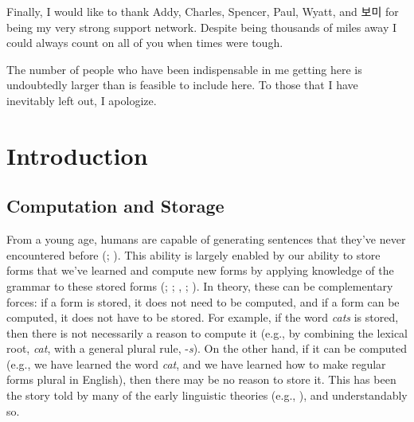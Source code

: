 \documentclass[
  letterpaper,
  DIV=11,
  numbers=noendperiod,
  nottoc]{scrreprt}
\begin{document}
Finally, I would like to thank Addy, Charles, Spencer, Paul, Wyatt, and
보미 for being my very strong support network. Despite being thousands
of miles away I could always count on all of you when times were tough.

The number of people who have been indispensable in me getting here is
undoubtedly larger than is feasible to include here. To those that I
have inevitably left out, I apologize.


\chapter{Introduction}\label{introduction}


\section{Computation and Storage}\label{computation-and-storage}

From a young age, humans are capable of generating sentences that
they've never encountered before
(;
). This ability
is largely enabled by our ability to store forms that we've learned and
compute new forms by applying knowledge of the grammar to these stored
forms (;
;
,
;
). In theory,
these can be complementary forces: if a form is stored, it does not need
to be computed, and if a form can be computed, it does not have to be
stored. For example, if the word \emph{cats} is stored, then there is
not necessarily a reason to compute it (e.g., by combining the lexical
root, \emph{cat}, with a general plural rule, -\emph{s}). On the other
hand, if it can be computed (e.g., we have learned the word \emph{cat},
and we have learned how to make regular forms plural in English), then
there may be no reason to store it. This has been the story told by many
of the early linguistic theories (e.g.,
), and understandably so.
\end{document}
